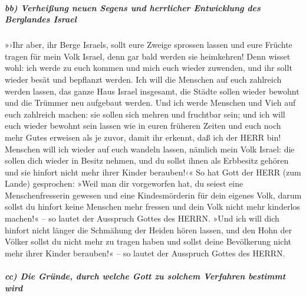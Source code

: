 \hypertarget{bb-verheiuxdfung-neuen-segens-und-herrlicher-entwicklung-des-berglandes-israel}{%
\subparagraph{bb) Verheißung neuen Segens und herrlicher Entwicklung des
Berglandes
Israel}\label{bb-verheiuxdfung-neuen-segens-und-herrlicher-entwicklung-des-berglandes-israel}}

»›Ihr aber, ihr Berge Israels, sollt eure Zweige sprossen
lassen und eure Früchte tragen für mein Volk Israel, denn gar bald
werden sie heimkehren! Denn wisset wohl: ich werde zu euch
kommen und mich euch wieder zuwenden, und ihr sollt wieder besät und
bepflanzt werden. Ich will die Menschen auf euch
zahlreich werden lassen, das ganze Haus Israel insgesamt, die Städte
sollen wieder bewohnt und die Trümmer neu aufgebaut werden.
Und ich werde Menschen und Vieh auf euch zahlreich
machen: sie sollen sich mehren und fruchtbar sein; und ich will euch
wieder bewohnt sein lassen wie in euren früheren Zeiten und euch noch
mehr Gutes erweisen als je zuvor, damit ihr erkennt, daß ich der HERR
bin! Menschen will ich wieder auf euch wandeln lassen,
nämlich mein Volk Israel: die sollen dich wieder in Besitz nehmen, und
du sollst ihnen als Erbbesitz gehören und sie hinfort nicht mehr ihrer
Kinder berauben!‹« So hat Gott der HERR (zum Lande)
gesprochen: »Weil man dir vorgeworfen hat, du seiest eine
Menschenfresserin gewesen und eine Kindesmörderin für dein eigenes Volk,
darum sollst du hinfort keine Menschen mehr fressen und
dein Volk nicht mehr kinderlos machen!« -- so lautet der Ausspruch
Gottes des HERRN. »Und ich will dich hinfort nicht länger
die Schmähung der Heiden hören lassen, und den Hohn der Völker sollst du
nicht mehr zu tragen haben und sollst deine Bevölkerung nicht mehr ihrer
Kinder berauben!« -- so lautet der Ausspruch Gottes des HERRN.

\hypertarget{cc-die-gruxfcnde-durch-welche-gott-zu-solchem-verfahren-bestimmt-wird}{%
\subparagraph{cc) Die Gründe, durch welche Gott zu solchem Verfahren
bestimmt
wird}\label{cc-die-gruxfcnde-durch-welche-gott-zu-solchem-verfahren-bestimmt-wird}}

